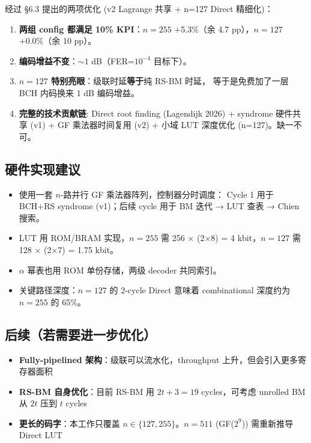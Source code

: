 \documentclass[11pt,a4paper]{article}
\begin{document}
\begin{keybox}[title=\textbf{核心成果}]
经过 §6.3 提出的两项优化 (v2 Lagrange 共享 + n=127 Direct 精细化)：

\begin{enumerate}[leftmargin=1.5em, itemsep=2pt]
\item \textbf{两组 config 都满足 10\% KPI}：$n=255$ +5.3\%（余 4.7 pp），$n=127$ +0.0\%（余 10 pp）。
\item \textbf{编码增益不变}：$\sim 1$ dB（FER=$10^{-4}$ 目标下）。
\item \textbf{$n=127$ 特别亮眼}：级联时延\textbf{等于}纯 RS-BM 时延，
    等于是免费加了一层 BCH 内码换来 1 dB 编码增益。
\item \textbf{完整的技术贡献链}: Direct root finding (Lagendijk 2026)
    + syndrome 硬件共享 (v1) + GF 乘法器时间复用 (v2)
    + 小域 LUT 深度优化 (n=127)。缺一不可。
\end{enumerate}
\end{keybox}

\subsection{硬件实现建议}

\begin{itemize}[leftmargin=1.5em, itemsep=1pt]
\item 使用一套 $n$-路并行 GF 乘法器阵列，控制器分时调度：
    Cycle 1 用于 BCH+RS syndrome (v1)；后续 cycle 用于 BM 迭代 → LUT 查表 → Chien 搜索。
\item LUT 用 ROM/BRAM 实现，$n=255$ 需 256 × (2$\times$8) = 4 kbit，$n=127$ 需 128 × (2$\times$7) = 1.75 kbit。
\item $\alpha$ 幂表也用 ROM 单份存储，两级 decoder 共同索引。
\item 关键路径深度：$n=127$ 的 2-cycle Direct 意味着 combinational 深度约为 $n=255$ 的 65\%。
\end{itemize}

\subsection{后续（若需要进一步优化）}

\begin{itemize}[leftmargin=1.5em, itemsep=1pt]
\item \textbf{Fully-pipelined 架构}：级联可以流水化，throughput 上升，但会引入更多寄存器面积
\item \textbf{RS-BM 自身优化}：目前 RS-BM 用 $2t+3 = 19$ cycles，可考虑 unrolled BM 从 $2t$ 压到 $t$ cycles
\item \textbf{更长的码字}：本工作只覆盖 $n\in\{127, 255\}$。$n=511$ (GF($2^9$)) 需重新推导 Direct LUT
\end{itemize}
\end{document}
